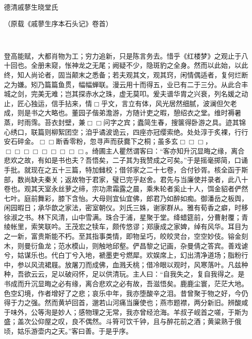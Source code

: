 \begin{flushright}
	德清戚蓼生晓堂氏　　

{（原载《戚蓼生序本石头记》卷首）}　
\end{flushright}　

{}

登高能赋，大都肖物为工；穷力追新，只是陈言务去。惜乎《红楼梦》之观止于八十回也。全册未窥，怅神龙之无尾；阙疑不少，隐斑豹之全身。然而以此始，以此终，知人尚论者，固当颠末之悉备；若夫观其文，观其窍，闲情偶适者，复何烂断之为嫌。矧乃篇篇鱼贯，幅幅蝉联。漫云用十而得五，业已有二于三分。从此合丰城之剑，完美无难；岂其探赤水之珠，虚无莫叩。爰夫谱华胄之兴衰，列名媛之动止，匠心独运，信手拈来，情{$\Box$}乎文，言立有体，风光居然细腻，波澜但欠老成，则是书之大略也。董园子偕弟澹游，方随计吏之暇，憩绍衣之堂。维时褥暑蒸，时雨霈。苔衣封壁，兼{$\Box\Box$}问字之宾；蠹简生春，搜箧得卧游之具。迹其锦心绣口，联篇则柳絮团空；洎乎谲波诡云，四座亦冠缨索绝。处处淳于炙裸，行行安石碎金。{$\Box\Box$}断香零粉，忽寻声而获爨下之桐；虽多玄{$\Box\Box\Box$}，{$\Box\Box\Box\Box\Box\Box\Box\Box\Box$}。绮圃主人瞿然谓客曰：“客亦知升沉显晦之缘，离合悲欢之故，有如是书也夫？吾悟矣，二子其为我赞成之可矣。”于是摇毫掷简，口诵手批。就现在之五十三篇，特加雠校；借邻家之二十七卷，合付钞胥。核全函于斯部，数尚缺夫秦关；返故物于君家，璧已完乎赵舍。{君先与当廉使并录者，此八十卷也。}观其天室永丝萝之缔，宗功肃霜露之晨，乘朱轮者奚止十人，饵金貂者俨然七叶。庭前舞彩，膝下含怡。大母则宜仙宜佛，郎君乃如醉如痴。御潘岳之板舆，闲园暇日；承华歆之家法，密室朝仪。刘氏三姝，谢家群从。雅有荀香之癖，时移徐淑之书。林下风清，山中雪满。珠合于浦，星聚于堂。绛蜡筵前，分曹射覆；青绫帐里，索笑联吟。王茂宏之犊车，颇传悠谬；郑康成之家婢，绰有风华。耳目为之一新，富贵斯能不朽。至其指事类情，即物呈巧，皎皎灵台，空空妙伎。镕金刻木，则曼衍鱼龙；范水模山，则触地邱壑。俨昌黎之记画，杂曼倩之答宾。善戏谑兮，姑谋乐也。代白丁兮入地，褫墨吏兮燃犀。欢娱席上，幻出清净道场；脂粉行中，参以风流裙屐。放屠刀而成佛，血溅夭桃；借冷眼以观时，风寒落叶。凡兹种种，吾欲云云，足以破闷怀，足以供清玩。主人曰：“自我失之，复自我得之。是书成而升沉显晦之必有缘，离合悲欢之必有故，吾滋悟矣。鹿鹿尘寰，茫茫大地。色空幻境，作者增好了之悲；哀乐中年，我亦堕酸辛之泪。昔曾聚于物之好，今仍得于力之强。然而黄垆回首，邈若山河{痛当廉使也}；燕市题襟，两分新旧。辨酸咸于味外，公等洵是妙人；感物理之无常，我亦曾经沧海。羊叔子岘首之嗟，于斯为盛；盖次公仰屋之叹，良不偶然。斗筲可饮千钟，且与醉花前之酒；黄粱熟于俄顷，姑乐游壶内之天。”客曰善。于是乎序。

